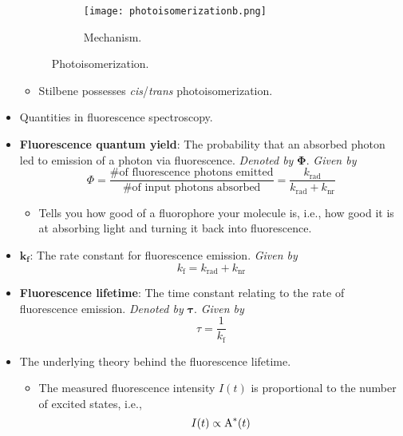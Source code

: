 \documentclass[../notes.tex]{subfiles}
\begin{document}
\begin{itemize}
\begin{figure}[h!]
\begin{subfigure}[b]{0.3\linewidth}
            \centering
            \texttt{[image: photoisomerizationb.png]}
            \caption{Mechanism.}
            \label{fig:photoisomerizationb}
        \end{subfigure}
        \caption{Photoisomerization.}
        \label{fig:photoisomerization}
    \end{figure}
    \begin{itemize}
        \item Stilbene possesses \emph{cis}/\emph{trans} photoisomerization.
    \end{itemize}
    \item Quantities in fluorescence spectroscopy.
    \item \textbf{Fluorescence quantum yield}: The probability that an absorbed photon led to emission of a photon via fluorescence. \emph{Denoted by} $\bm{\Phi}$. \emph{Given by}
    \begin{equation*}
        \Phi = \frac{\text{\# of fluorescence photons emitted}}{\text{\# of input photons absorbed}}
        = \frac{k_\text{rad}}{k_\text{rad}+k_\text{nr}}
    \end{equation*}
    \begin{itemize}
        \item Tells you how good of a fluorophore your molecule is, i.e., how good it is at absorbing light and turning it back into fluorescence.
    \end{itemize}
    \item $\bm{k_\textbf{f}}$: The rate constant for fluorescence emission. \emph{Given by}
    \begin{equation*}
        k_\text{f} = k_\text{rad}+k_\text{nr}
    \end{equation*}
    \item \textbf{Fluorescence lifetime}: The time constant relating to the rate of fluorescence emission. \emph{Denoted by} $\bm{\tau}$. \emph{Given by}
    \begin{equation*}
        \tau = \frac{1}{k_\text{f}}
    \end{equation*}
    \item The underlying theory behind the fluorescence lifetime.
    \begin{itemize}
        \item The measured fluorescence intensity $I(t)$ is proportional to the number of excited states, i.e.,
        \begin{equation*}
            I(t) \propto \ce{A^*}(t)
        \end{equation*}

\end{itemize}
\end{itemize}
\end{document}
